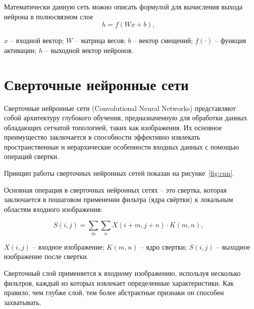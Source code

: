 
Математически данную сеть можно описать формулой для вычисления выхода нейрона 
в полносвязном слое
\begin{equation}
    {h} = f({W} {x} + {b}),
\end{equation}

   ${x}$ – входной вектор;
 ${W}$ – матрица весов;
 ${b}$ – вектор смещений;
 $f(\cdot)$ – функция активации;
 ${h}$ – выходной вектор нейронов.

\section{Сверточные нейронные сети}
\hspace*{12.5 mm}
Сверточные нейронные сети (Convolutional Neural Networks) представляют собой 
архитектуру глубокого обучения, предназначенную для обработки данных обладающих 
сетчатой топологией, таких как изображения. Их основное преимущество 
заключается в способности эффективно извлекать пространственные и иерархические 
особенности входных данных с помощью операций свертки.

Принцип работы сверточных нейронных сетей показан на рисунке~\ref{fig:cnn}\cite{CNN}.


Основная операция в сверточных нейронных сетях – это свертка, 
которая заключается в пошаговом применении фильтра (ядра 
свёртки) к локальным областям входного изображения:

\begin{equation}
    S(i, j) = \sum_{m} \sum_{n} X(i+m, j+n) \cdot K(m, n),
\end{equation}

  \( X(i, j) \) – входное изображение;
\( K(m, n) \) – ядро свертки;
\( S(i, j) \) – выходное изображение после свертки.

Сверточный слой применяется к входному изображению, используя несколько 
фильтров, каждый из которых извлекает определенные характеристики. Как правило,
чем глубже слой, тем более абстрактные признаки он способен захватывать.
